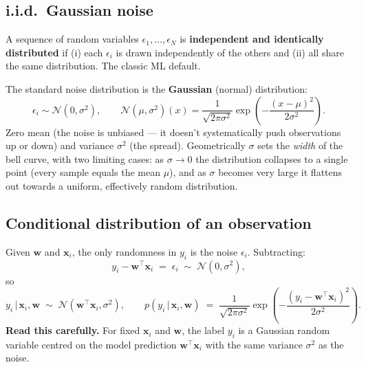 \documentclass[11pt, a4paper]{article}
\begin{document}
\subsection{i.i.d.\ Gaussian noise}

\begin{defbox}[i.i.d. noise]
A sequence of random variables $\epsilon_1,\ldots,\epsilon_N$ is \textbf{independent and identically distributed} if (i) each $\epsilon_i$ is drawn independently of the others and (ii) all share the same distribution. The classic ML default.
\end{defbox}

The standard noise distribution is the \textbf{Gaussian} (normal) distribution:
\[
\epsilon_i \sim \mathcal{N}(0,\sigma^2),
\qquad
\mathcal{N}(\mu,\sigma^2)(x) = \frac{1}{\sqrt{2\pi\sigma^2}}\exp\!\left(-\frac{(x-\mu)^2}{2\sigma^2}\right).
\]
Zero mean (the noise is unbiased — it doesn't systematically push observations up or down) and variance $\sigma^2$ (the spread). Geometrically $\sigma$ sets the \emph{width} of the bell curve, with two limiting cases: as $\sigma\to0$ the distribution collapses to a single point (every sample equals the mean $\mu$), and as $\sigma$ becomes very large it flattens out towards a uniform, effectively random distribution.

\subsection{Conditional distribution of an observation}

Given $\mathbf{w}$ and $\mathbf{x}_i$, the only randomness in $y_i$ is the noise $\epsilon_i$. Subtracting:
\[
y_i - \mathbf{w}^\top\mathbf{x}_i \;=\; \epsilon_i \;\sim\; \mathcal{N}(0,\sigma^2),
\]
so
\[
y_i \,|\,\mathbf{x}_i,\mathbf{w} \;\sim\; \mathcal{N}(\mathbf{w}^\top\mathbf{x}_i,\sigma^2),
\qquad
p(y_i\,|\,\mathbf{x}_i,\mathbf{w}) \;=\; \frac{1}{\sqrt{2\pi\sigma^2}}\exp\!\left(-\frac{(y_i-\mathbf{w}^\top\mathbf{x}_i)^2}{2\sigma^2}\right).
\]
\textbf{Read this carefully.} For fixed $\mathbf{x}_i$ and $\mathbf{w}$, the label $y_i$ is a Gaussian random variable centred on the model prediction $\mathbf{w}^\top\mathbf{x}_i$ with the same variance $\sigma^2$ as the noise.
\end{document}
